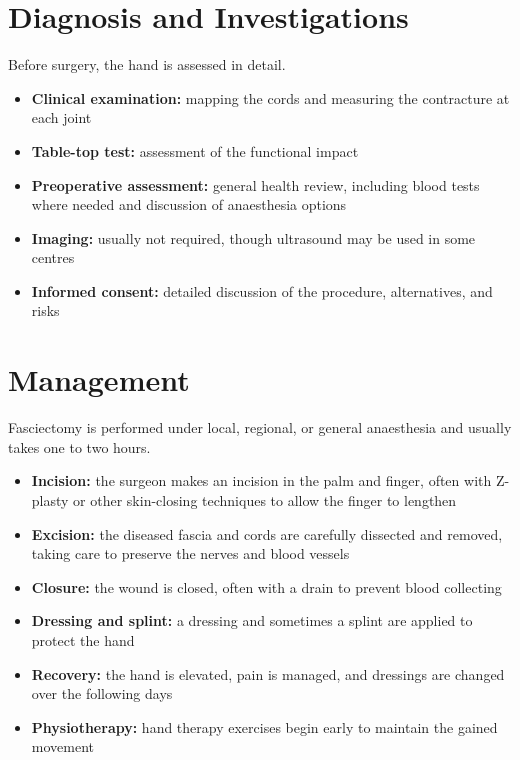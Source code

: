 \section*{Diagnosis and Investigations}
Before surgery, the hand is assessed in detail.
\begin{itemize}
    \item \textbf{Clinical examination:} mapping the cords and measuring the contracture at each joint
    \item \textbf{Table-top test:} assessment of the functional impact
    \item \textbf{Preoperative assessment:} general health review, including blood tests where needed and discussion of anaesthesia options
    \item \textbf{Imaging:} usually not required, though ultrasound may be used in some centres
    \item \textbf{Informed consent:} detailed discussion of the procedure, alternatives, and risks
\end{itemize}

\section*{Management}
Fasciectomy is performed under local, regional, or general anaesthesia and usually takes one to two hours.
\begin{itemize}
    \item \textbf{Incision:} the surgeon makes an incision in the palm and finger, often with Z-plasty or other skin-closing techniques to allow the finger to lengthen
    \item \textbf{Excision:} the diseased fascia and cords are carefully dissected and removed, taking care to preserve the nerves and blood vessels
    \item \textbf{Closure:} the wound is closed, often with a drain to prevent blood collecting
    \item \textbf{Dressing and splint:} a dressing and sometimes a splint are applied to protect the hand
    \item \textbf{Recovery:} the hand is elevated, pain is managed, and dressings are changed over the following days
    \item \textbf{Physiotherapy:} hand therapy exercises begin early to maintain the gained movement
\end{itemize}

